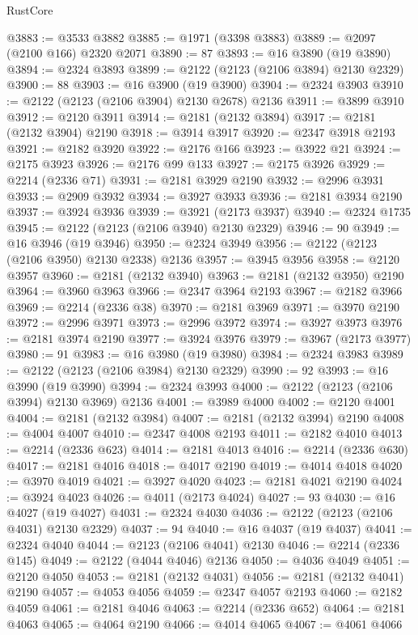 \begin{lexlean}{RustCore}
\begin{coremodule}
@3883 := @3533 @3882
@3885 := @1971 (@3398 @3883)
@3889 := @2097 (@2100 @166) @2320 @2071
@3890 := 87
@3893 := @16 @3890 (@19 @3890)
@3894 := @2324 @3893
@3899 := @2122 (@2123 (@2106 @3894) @2130 @2329)
@3900 := 88
@3903 := @16 @3900 (@19 @3900)
@3904 := @2324 @3903
@3910 := @2122 (@2123 (@2106 @3904) @2130 @2678) @2136
@3911 := @3899 @3910
@3912 := @2120 @3911
@3914 := @2181 (@2132 @3894)
@3917 := @2181 (@2132 @3904) @2190
@3918 := @3914 @3917
@3920 := @2347 @3918 @2193
@3921 := @2182 @3920
@3922 := @2176 @166
@3923 := @3922 @21
@3924 := @2175 @3923
@3926 := @2176 @99 @133
@3927 := @2175 @3926
@3929 := @2214 (@2336 @71)
@3931 := @2181 @3929 @2190
@3932 := @2996 @3931
@3933 := @2909 @3932
@3934 := @3927 @3933
@3936 := @2181 @3934 @2190
@3937 := @3924 @3936
@3939 := @3921 (@2173 @3937)
@3940 := @2324 @1735
@3945 := @2122 (@2123 (@2106 @3940) @2130 @2329)
@3946 := 90
@3949 := @16 @3946 (@19 @3946)
@3950 := @2324 @3949
@3956 := @2122 (@2123 (@2106 @3950) @2130 @2338) @2136
@3957 := @3945 @3956
@3958 := @2120 @3957
@3960 := @2181 (@2132 @3940)
@3963 := @2181 (@2132 @3950) @2190
@3964 := @3960 @3963
@3966 := @2347 @3964 @2193
@3967 := @2182 @3966
@3969 := @2214 (@2336 @38)
@3970 := @2181 @3969
@3971 := @3970 @2190
@3972 := @2996 @3971
@3973 := @2996 @3972
@3974 := @3927 @3973
@3976 := @2181 @3974 @2190
@3977 := @3924 @3976
@3979 := @3967 (@2173 @3977)
@3980 := 91
@3983 := @16 @3980 (@19 @3980)
@3984 := @2324 @3983
@3989 := @2122 (@2123 (@2106 @3984) @2130 @2329)
@3990 := 92
@3993 := @16 @3990 (@19 @3990)
@3994 := @2324 @3993
@4000 := @2122 (@2123 (@2106 @3994) @2130 @3969) @2136
@4001 := @3989 @4000
@4002 := @2120 @4001
@4004 := @2181 (@2132 @3984)
@4007 := @2181 (@2132 @3994) @2190
@4008 := @4004 @4007
@4010 := @2347 @4008 @2193
@4011 := @2182 @4010
@4013 := @2214 (@2336 @623)
@4014 := @2181 @4013
@4016 := @2214 (@2336 @630)
@4017 := @2181 @4016
@4018 := @4017 @2190
@4019 := @4014 @4018
@4020 := @3970 @4019
@4021 := @3927 @4020
@4023 := @2181 @4021 @2190
@4024 := @3924 @4023
@4026 := @4011 (@2173 @4024)
@4027 := 93
@4030 := @16 @4027 (@19 @4027)
@4031 := @2324 @4030
@4036 := @2122 (@2123 (@2106 @4031) @2130 @2329)
@4037 := 94
@4040 := @16 @4037 (@19 @4037)
@4041 := @2324 @4040
@4044 := @2123 (@2106 @4041) @2130
@4046 := @2214 (@2336 @145)
@4049 := @2122 (@4044 @4046) @2136
@4050 := @4036 @4049
@4051 := @2120 @4050
@4053 := @2181 (@2132 @4031)
@4056 := @2181 (@2132 @4041) @2190
@4057 := @4053 @4056
@4059 := @2347 @4057 @2193
@4060 := @2182 @4059
@4061 := @2181 @4046
@4063 := @2214 (@2336 @652)
@4064 := @2181 @4063
@4065 := @4064 @2190
@4066 := @4014 @4065
@4067 := @4061 @4066

\end{coremodule}
\end{lexlean}
